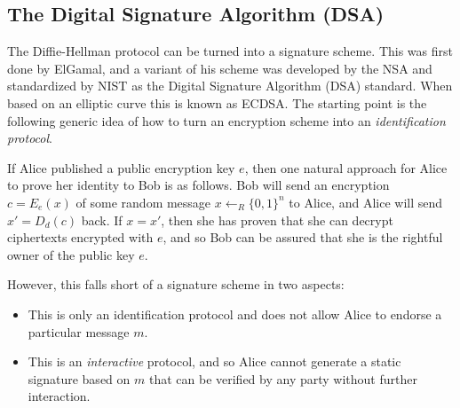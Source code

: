 \hypertarget{strongunforgabilitysigrem}{}

\subsection{The Digital Signature Algorithm
(DSA)}\label{The-Digital-Signature-Algorith}

The Diffie-Hellman protocol can be turned into a signature scheme. This
was first done by ElGamal, and a variant of his scheme was developed by
the NSA and standardized by NIST as the Digital Signature Algorithm
(DSA) standard. When based on an elliptic curve this is known as ECDSA.
The starting point is the following generic idea of how to turn an
encryption scheme into an \emph{identification protocol}.

If Alice published a public encryption key \(e\), then one natural
approach for Alice to prove her identity to Bob is as follows. Bob will
send an encryption \(c=E_e(x)\) of some random message
\(x \leftarrow_R \{0,1\}^n\) to Alice, and Alice will send \(x'=D_d(c)\)
back. If \(x=x'\), then she has proven that she can decrypt ciphertexts
encrypted with \(e\), and so Bob can be assured that she is the rightful
owner of the public key \(e\).

However, this falls short of a signature scheme in two aspects:

\begin{itemize}
\tightlist
\item
  This is only an identification protocol and does not allow Alice to
  endorse a particular message \(m\).\\
\item
  This is an \emph{interactive} protocol, and so Alice cannot generate a
  static signature based on \(m\) that can be verified by any party
  without further interaction.
\end{itemize}

